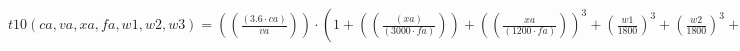 \documentclass[preview,border=1pt]{standalone}
\begin{document}
$
t10 (ca,va,xa,fa,w1,w2,w3) = \left(\left(\frac{\left(\num{3.6}\cdot ca\right)}{va}\right)\right)\cdot \left(\num{1}+\left(\left(\frac{\left(xa\right)}{\left(\num{3000}\cdot fa\right)}\right)\right)+\left(\left(\frac{xa}{\left(\num{1200}\cdot fa\right)}\right)\right)^{\num{3}}+\left(\frac{w1}{\num{1800}}\right)^{\num{3}}+\left(\frac{w2}{\num{1800}}\right)^{\num{3}}+\left(\frac{w3}{\num{1800}}\right)^{\num{3}}\right)
$
\end{document}
